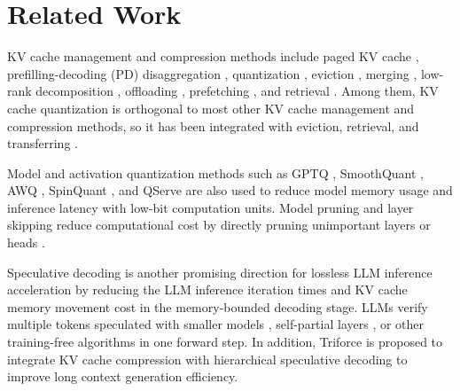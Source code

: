 \section{Related Work}
KV cache management and compression methods include paged KV cache \cite{kwon2023vllm}, prefilling-decoding (PD) disaggregation \cite{qin2407mooncake},  quantization \cite{liu2024kivi, liu2024intactkv, hooper2024kvquant, zhang2024qhitter, yang2024mikv, he2024zipcache, he2024zipvl,dong2024qaq}, eviction \cite{zhang2024h2o, ge2023fastgen, liu2024scissorhands, li2024snapkv, adnan2024keyformer}, merging \cite{zhang2024cam, wang2024model, wan2024look-m, liu2024minicache}, low-rank decomposition \cite{kang2024gear, sun2024shadowkv}, offloading \cite{sheng2023flexgen, zhang2024pqcache}, prefetching \cite{lee2024infinigen}, and retrieval \cite{tang2024quest}.
Among them, KV cache quantization is orthogonal to most other KV cache management and compression methods, so it has been integrated with eviction, retrieval, and transferring \cite{tang2024quest, liu2024cachegen}.

Model and activation quantization methods such as GPTQ \cite{frantar2022gptq}, SmoothQuant \cite{xiao2023smoothquant}, AWQ \cite{lin2024awq}, SpinQuant \cite{liu2024spinquant}, and QServe \cite{lin2024qserve} are also used to reduce model memory usage and inference latency with low-bit computation units. Model pruning and layer skipping reduce computational cost by directly pruning unimportant layers or heads \cite{ma2023llmpruner, zeng2023learning, elhoushi2024layerskip}.

Speculative decoding is another promising direction for lossless LLM inference acceleration by reducing the LLM inference iteration times and KV cache memory movement cost in the memory-bounded decoding stage. LLMs verify multiple tokens speculated with smaller models \cite{li2024eagle}, self-partial layers \cite{cai2024medusa, liu2024deepseekv3, gloeckle2024mtp, stern2018blockwise}, or other training-free algorithms \cite{zhao2024lookahead} in one forward step. In addition, Triforce \cite{sun2024triforce} is proposed to integrate KV cache compression with hierarchical speculative decoding to improve long context generation efficiency.